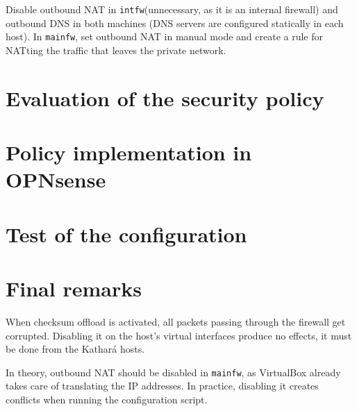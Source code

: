 \documentclass[draft]{homework}
\newcommand{\intfw}{\texttt{intfw}\xspace}
\newcommand{\kat}{Kathará\xspace}
\newcommand{\mainfw}{\texttt{mainfw}\xspace}
\newcommand{\opn}{OPNsense\xspace}
\newcommand{\vb}{VirtualBox\xspace}
\begin{document}
    Disable outbound NAT in \intfw (unnecessary, as it is an internal firewall) and outbound DNS in both machines (DNS servers are configured statically in each host). In \mainfw, set outbound NAT in manual mode and create a rule for NATting the traffic that leaves the private network.
    
    
    \section{Evaluation of the security policy}
    
    
    \section{Policy implementation in \opn}
    
    
    \section{Test of the configuration}
    
    
    \section{Final remarks}
    When checksum offload is activated, all packets passing through the firewall get corrupted. Disabling it on the host's virtual interfaces produce no effects, it must be done from the \kat hosts.
    
    In theory, outbound NAT should be disabled in \mainfw, as \vb already takes care of translating the IP addresses. In practice, disabling it creates conflicts when running the configuration script.
\end{document}
